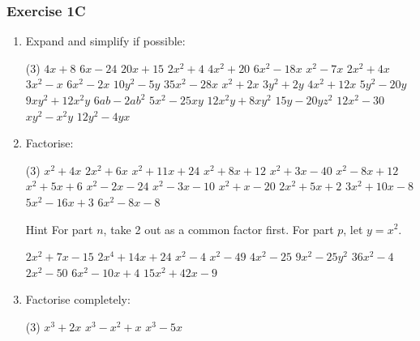 \documentclass[fleqn]{article}
\newcounter{taskscounter}
\newcommand\getcurrentref[1]{%
 \ifnumequal{\value{#1}}{0}
  {??}
  {\the\value{#1}}%
}
\newcommand{\exercise}{\subsubsection}
\begin{document}
\exercise{Exercise 1C}
\begin{enumerate}
	\item Expand and simplify if possible:
		\begin{tasks}(3) %
		  	\task $4x+8$			%
		  	\task $6x-24$		%
		  	\task $20x+15$		%
		  	\task $2x^2+4$		%
		  	\task $4x^2+20$		%
		  	\task $6x^2-18x$		%
		  	\task $x^2-7x$		%
		  	\task $2x^2+4x$		%
		  	\task $3x^2-x$		%
		  	\task $6x^2-2x$		%
		  	\task $10y^2-5y$		%
		  	\task $35x^2-28x$	%
		  	\task $x^2+2x$		%
		  	\task $3y^2+2y$		%
		  	\task $4x^2+12x$		%
		  	\task $5y^2-20y$		%
		  	\task $9xy^2+12x^2y$	%
		  	\task $6ab-2ab^2$	%
		  	\task $5x^2-25xy$	%
		  	\task $12x^2y+8xy^2$	%
		  	\task $15y-20yz^2$	%
		  	\task $12x^2-30$		%
		  	\task $xy^2-x^2y$	%
		  	\task $12y^2-4yx$	%
		\end{tasks}
		\newpage
	\item Factorise:
		\begin{tasks}(3) %
			\task $x^2+4x$			%
			\task $2x^2+6x$			%
			\task $x^2+11x+24$		%
			\task $x^2+8x+12$		%
			\task $x^2+3x-40$		%
			\task $x^2-8x+12$		%
			\task $x^2+5x+6$			%
			\task $x^2-2x-24$		%
			\task $x^2-3x-10$		%
			\task $x^2+x-20$			%
			\task $2x^2+5x+2$		%
			\task $3x^2+10x-8$		%
			\task $5x^2-16x+3$		%
			\task $6x^2-8x-8$ 		%
			\task[]
				\hspace*{-2.25cm}
				\begin{minipage}[t][][c]{0.42\textwidth}
				\vspace{-0.4cm}
				\begin{note*}{Hint}{}
 					For part $n$, take 2 out as a common factor first. For part $p$, let $y=x^2$.
 				\end{note*}
				\setcounter{taskscounter}{\getcurrentref{taskscounter}-1}
				\end{minipage}
				\vspace{-200cm}
			\task $2x^2+7x-15$		%
			\task* $2x^4+14x+24$		%
			\task $x^2-4$			%
			\task* $x^2-49$			%
			\task $4x^2-25$			%
			\task $9x^2-25y^2$		%
			\task $36x^2-4$			%
			\task $2x^2-50$			%
			\task $6x^2-10x+4$		%
			\task $15x^2+42x-9$		%
		\end{tasks}
	\item Factorise completely:
		\begin{tasks}(3) %
			\task $x^3+2x$			%
			\task $x^3-x^2+x$		%
			\task $x^3-5x$			%

\end{tasks}
\end{enumerate}
\end{document}
